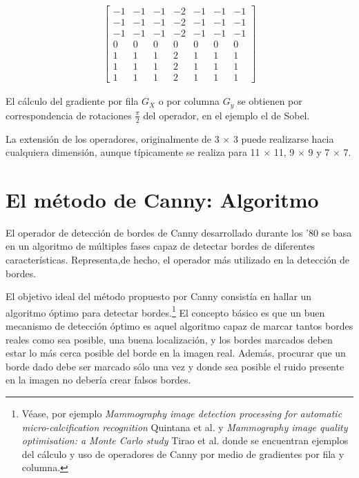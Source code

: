\begin{eqnarray}
	\left[  \begin{array}{ccccccc}  -1 & -1 & -1  & -2 & -1 & -1 & -1\\  -1 & -1 & -1  & -2 & -1 & -1 & -1 \\ 
	-1 & -1 & -1  & -2 & -1 & -1 & -1 \\ 0 & 0 & 0  & 0 & 0 & 0 & 0 \\ 1 & 1 & 1  & 2 & 1 & 1 & 1 \\
	1 & 1 & 1  & 2 & 1 & 1 & 1 \\ 1 & 1 & 1  & 2 & 1 & 1 & 1 
	\end{array} \right] %
\label{EqAAG}
\end{eqnarray}


El c\'alculo del gradiente por fila $G_{X}$ o por columna $G_{y}$ se obtienen por correspondencia de rotaciones $\frac{\pi}{2}$ del 
operador, en el ejemplo el de Sobel.
%

La extensi\'on de los operadores, originalmente de 3 $\times$ 3 puede realizarse hacia cualquiera dimensi\'on, aunque t\'ipicamente se
realiza para 11 $\times$ 11, 9 $\times$ 9 y 7 $\times$ 7.

\section{El m\'etodo de Canny: Algoritmo}
\label{CapV_8}

El operador de detecci\'on de bordes de Canny desarrollado durante los '80 se basa en un algoritmo de m\'ultiples fases capaz de detectar 
bordes de diferentes caracter\'isticas. 
%
Representa,de hecho, el operador m\'as utilizado en la detecci\'on de bordes.
%

El objetivo ideal del m\'etodo propuesto por Canny consist\'ia en hallar un algoritmo \'optimo para detectar bordes.\footnote{V\'ease, por 
ejemplo \textit{Mammography image detection processing for automatic micro-calcification recognition} Quintana et al. y 
\textit{Mammography image quality optimisation: a Monte Carlo study} Tirao et al. donde se encuentran ejemplos del c\'alculo y uso de 
operadores de Canny por medio de gradientes por fila y columna.} 
%
El concepto b\'asico es que un buen mecanismo de detecci\'on \'optimo es aquel algoritmo capaz de marcar tantos bordes reales como sea 
posible, una buena localizaci\'on, y los bordes marcados deben estar lo m\'as cerca posible del borde en la imagen real. 
%
Adem\'as, procurar que un borde dado debe ser marcado s\'olo una vez y donde sea posible el ruido presente en la imagen no deber\'ia crear 
falsos bordes.
%

